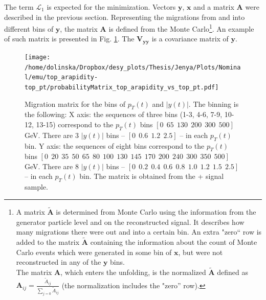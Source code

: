 The term $\mathcal{L}_{1}$ is expected for the minimization. Vectors $\mathbf{y}$, $\mathbf{x}$ and a matrix $\mathbf{A}$ were
described in the previous section. Representing the migrations from and into different bins of $\mathbf{y}$, the matrix $\mathbf{A}$
is defined from the Monte Carlo\footnote{A matrix $\mathbf{\tilde{A}}$ is
determined from Monte Carlo using the information from the generator particle level and on the reconstructed signal. It describes how many 
migrations there were out and into a certain bin. An extra "zero`` row is added
to the matrix $\mathbf{\tilde{A}}$ containing the information about the count of Monte Carlo events which were generated in some bin of $\mathbf{x}$,
but were not reconstructed in any of the $\mathbf{y}$ bins. \\ The matrix $\mathbf{A}$, which enters the unfolding, is the normalized $\mathbf{\tilde{A}}$
defined as $\mathbf{A}_{ij} = \frac{\tilde{A}_{ij}}{\sum_{j=0}\tilde{A}_{ij}}$ (the normalization includes the "zero'' row).}. An example of such matrix 
is presented in Fig. \ref{fig:migMat}. The $\mathbf{V_{yy}}$ is a covariance matrix of $\mathbf{y}$. 

\begin{figure}[p]
  \centering
  \texttt{[image: /home/dolinska/Dropbox/desy\_plots/Thesis/Jenya/Plots/Nominal/emu/top\_arapidity-top\_pt/probabilityMatrix\_top\_arapidity\_vs\_top\_pt.pdf]}
  \caption{Migration matrix for the bins of $p_{T}(t)$ and $|y(t)|$. The binning is the following:
  X axis: the sequences of three bins (1-3, 4-6, 7-9, 10-12, 13-15) correspond to the $p_{T}(t)$ bins $[0\:\:65\:\:130\:\:200\:\:300\:\:500]$ GeV.
          There are 3 $|y(t)|$ bins -- $[0\:\:0.6\:\:1.2\:\:2.5]$ -- in each $p_{T}(t)$ bin.
  Y axis: the sequences of eight bins correspond to the $p_{T}(t)$ bins $[0\:\:20\:\:35\:\:50\:\:65\:\:80\:\:100\:\:130\:\:145\:\:170\:\:200\:\:240\:\:300\:\:350\:\:500]$ GeV.
          There are 8 $|y(t)|$ bins -- $[0\:\:0.2\:\:0.4\:\:0.6\:\:0.8\:\:1.0\:\:1.2\:\:1.5\:\:2.5]$ -- in each $p_{T}(t)$ bin.
  The matrix is obtained from the \MG +  signal sample.}
  \label{fig:migMat}
\end{figure}

